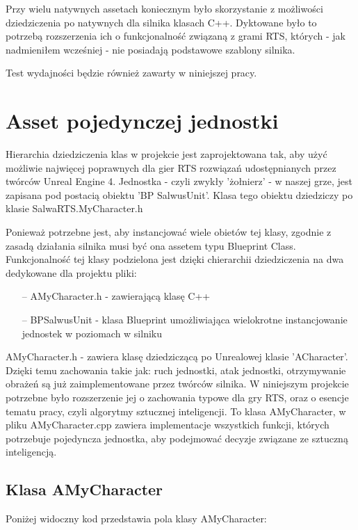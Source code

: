 \documentclass[12pt]{report}
\begin{document}
Przy wielu natywnych assetach koniecznym było skorzystanie z możliwości dziedziczenia po natywnych dla silnika klasach C++. Dyktowane było to potrzebą rozszerzenia ich o funkcjonalność związaną z grami RTS, których - jak nadmieniłem wcześniej - nie posiadają podstawowe szablony silnika.


Test wydajności będzie również zawarty w niniejszej pracy.

\section{Asset pojedynczej jednostki}

Hierarchia dziedziczenia klas w projekcie jest zaprojektowana tak, aby użyć możliwie najwięcej poprawnych dla gier RTS rozwiązań udostępnianych przez twórców Unreal Engine 4. Jednostka - czyli zwykły 'żołnierz' - w naszej grze, jest zapisana pod postacią obiektu 'BP SalwusUnit'. Klasa tego obiektu dziedziczy po klasie SalwaRTS.MyCharacter.h

Ponieważ potrzebne jest, aby instancjować wiele obietów tej klasy, zgodnie z zasadą działania silnika musi być ona assetem typu Blueprint Class. Funkcjonalność tej klasy podzielona jest dzięki chierarchii dziedziczenia na dwa dedykowane dla projektu pliki: 
\begin{itemize}
\item[--] AMyCharacter.h - zawierającą klasę C++
\item[--] BPSalwusUnit - klasa Blueprint umożliwiająca wielokrotne instancjowanie jednostek w poziomach w silniku
\end{itemize}

AMyCharacter.h - zawiera klasę dziedziczącą po Unrealowej klasie 'ACharacter'. Dzięki temu zachowania takie jak: ruch jednostki, atak jednostki, otrzymywanie obrażeń są już zaimplementowane przez twórców silnika. W niniejszym projekcie potrzebne było rozszerzenie jej o zachowania typowe dla gry RTS, oraz o esencje tematu pracy, czyli algorytmy sztucznej inteligencji. To klasa AMyCharacter, w pliku AMyCharacter.cpp zawiera implementacje wszystkich funkcji, których potrzebuje pojedyncza jednostka, aby podejmować decyzje związane ze sztuczną inteligencją.

\subsection{Klasa AMyCharacter}
Poniżej widoczny kod przedstawia pola klasy AMyCharacter:
\end{document}
